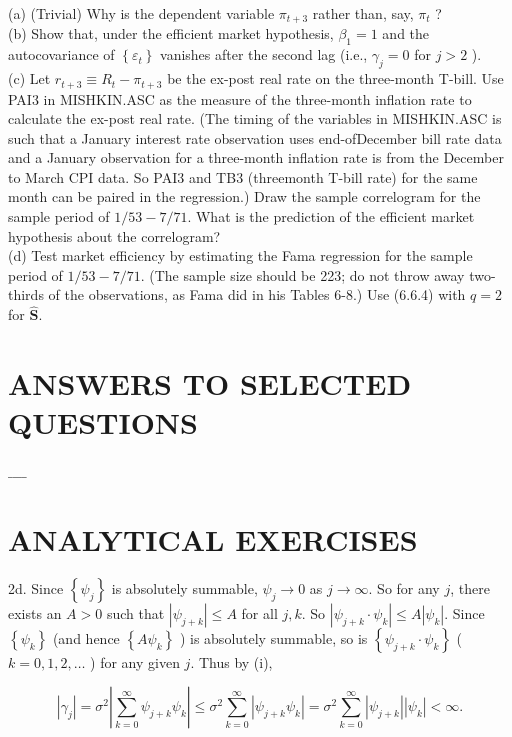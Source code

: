 \documentclass[10pt]{article}
\begin{document}
(a) (Trivial) Why is the dependent variable $\pi_{t+3}$ rather than, say, $\pi_{t}$ ?\\
(b) Show that, under the efficient market hypothesis, $\beta_{1}=1$ and the autocovariance of $\left\{\varepsilon_{t}\right\}$ vanishes after the second lag (i.e., $\gamma_{j}=0$ for $j>2$ ).\\
(c) Let $r_{t+3} \equiv R_{t}-\pi_{t+3}$ be the ex-post real rate on the three-month T-bill. Use PAI3 in MISHKIN.ASC as the measure of the three-month inflation rate to calculate the ex-post real rate. (The timing of the variables in MISHKIN.ASC is such that a January interest rate observation uses end-ofDecember bill rate data and a January observation for a three-month inflation rate is from the December to March CPI data. So PAI3 and TB3 (threemonth T-bill rate) for the same month can be paired in the regression.) Draw the sample correlogram for the sample period of $1 / 53-7 / 71$. What is the prediction of the efficient market hypothesis about the correlogram?\\
(d) Test market efficiency by estimating the Fama regression for the sample period of $1 / 53-7 / 71$. (The sample size should be 223; do not throw away two-thirds of the observations, as Fama did in his Tables 6-8.) Use (6.6.4) with $q=2$ for $\widehat{\mathbf{S}}$.

\section*{ANSWERS TO SELECTED QUESTIONS}
$\_\_\_\_$

\section*{ANALYTICAL EXERCISES}
2d. Since $\left\{\psi_{j}\right\}$ is absolutely summable, $\psi_{j} \rightarrow 0$ as $j \rightarrow \infty$. So for any $j$, there exists an $A>0$ such that $\left|\psi_{j+k}\right| \leq A$ for all $j, k$. So $\left|\psi_{j+k} \cdot \psi_{k}\right| \leq A\left|\psi_{k}\right|$. Since $\left\{\psi_{k}\right\}$ (and hence $\left\{A \psi_{k}\right\}$ ) is absolutely summable, so is $\left\{\psi_{j+k} \cdot \psi_{k}\right\}$ ( $k= 0,1,2, \ldots$ ) for any given $j$. Thus by (i),

$$
\left|\gamma_{j}\right|=\sigma^{2}\left|\sum_{k=0}^{\infty} \psi_{j+k} \psi_{k}\right| \leq \sigma^{2} \sum_{k=0}^{\infty}\left|\psi_{j+k} \psi_{k}\right|=\sigma^{2} \sum_{k=0}^{\infty}\left|\psi_{j+k}\right|\left|\psi_{k}\right|<\infty .
$$
\end{document}
